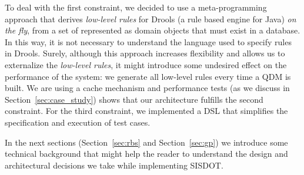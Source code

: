 To deal with the first constraint, we decided to use a meta-programming approach that derives 
\emph{low-level rules} for Drools (a rule based engine for Java) \emph{on the fly}, from a set of \callers represented 
as domain objects that must exist in a database. In this way, it is not necessary to understand 
the language used to specify rules in Drools. Surely, although this approach increases flexibility and  
allows us to externalize the \emph{low-level rules}, it might introduce some undesired effect on 
the performance of the system: we generate all low-level rules every time a QDM is built. We are using 
a cache mechanism and performance tests (as we discuss in Section~\ref{sec:case_study}) 
shows that our architecture fulfills the second constraint. For the third constraint, we implemented a DSL that simplifies the specification and 
execution of test cases. 

In the next sections (Section~\ref{sec:rbs} and Section~\ref{sec:gp}) 
we introduce some technical background that might help the reader to understand 
the design and architectural decisions we take while implementing SISDOT.  
 



